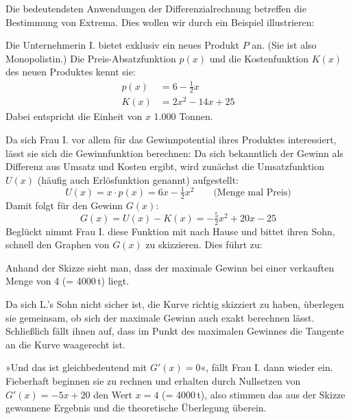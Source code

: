 Die bedeutendsten Anwendungen der Differenzialrechnung betreffen die Bestimmung von Extrema. Dies wollen wir durch ein Beispiel illustrieren:

Die Unternehmerin I. bietet exklusiv ein neues Produkt $P$ an. (Sie ist also Monopolistin.) Die Preis-Absatzfunktion $p(x)$ und die Kostenfunktion $K(x)$ des neuen Produktes kennt sie:
\begin{align*}
  p(x) &= 6 - \tfrac{1}{2} x\\
  K(x) &= 2x^2 - 14x + 25
\end{align*}
Dabei entspricht die Einheit von $x$ 1.000 Tonnen.

Da sich Frau I. vor allem für das Gewinnpotential ihres Produktes interessiert, lässt sie sich die Gewinnfunktion berechnen: Da sich bekanntlich der Gewinn als Differenz aus Umsatz und Kosten ergibt, wird zunächst die Umsatzfunktion $U(x)$ (häufig auch Erlösfunktion genannt) aufgestellt:
\[ U(x) = x \cdot p(x) = 6x - \tfrac{1}{2} x^2 \qquad \text{(Menge mal Preis)} \]
Damit folgt für den Gewinn $G(x)$:
\[ G(x) = U(x) - K(x) = -\tfrac{5}{2} x^2 + 20x - 25 \]
Beglückt nimmt Frau I. diese Funktion mit nach Hause und bittet ihren Sohn, schnell den Graphen von $G(x)$ zu skizzieren. Dies führt zu:

\begin{center}
\end{center}

Anhand der Skizze sieht man, dass der maximale Gewinn bei einer verkauften Menge von 4 (= 4000\,t) liegt.

Da sich L.'s Sohn nicht sicher ist, die Kurve richtig skizziert zu haben, überlegen sie gemeinsam, ob sich der maximale Gewinn auch exakt berechnen lässt. Schließlich fällt ihnen auf, dass im Punkt des maximalen Gewinnes die Tangente an die Kurve waagerecht ist.

»Und das ist gleichbedeutend mit $G'(x) = 0$«, fällt Frau I. dann wieder ein. Fieberhaft beginnen sie zu rechnen und erhalten durch Nullsetzen von $G'(x) = -5x + 20$ den Wert $x = 4$ (= 4000\,t), also stimmen das aus der Skizze gewonnene Ergebnis und die theoretische Überlegung überein.

